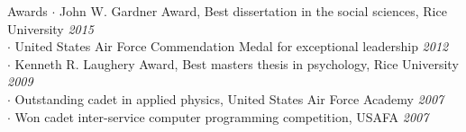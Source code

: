 
\begin{rSection}{Awards}
  $\cdot$ John W. Gardner Award, Best dissertation in the social sciences, Rice University
  \hfill {\em 2015} \\
  $\cdot$ United States Air Force Commendation Medal for exceptional leadership 
  \hfill {\em 2012} \\
  $\cdot$ Kenneth R. Laughery Award, Best masters thesis in psychology, Rice University
  \hfill {\em 2009} \\
  $\cdot$ Outstanding cadet in applied physics, United States Air Force Academy
  \hfill {\em 2007} \\
  $\cdot$ Won cadet inter-service computer programming competition, USAFA
  \hfill {\em 2007}
\end{rSection}
